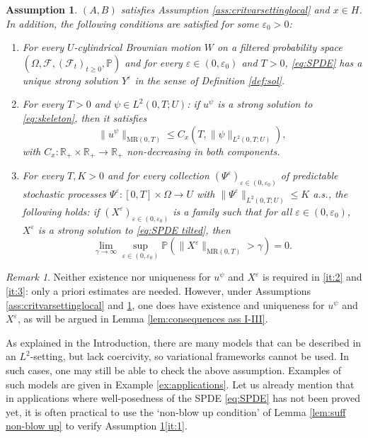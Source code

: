 \documentclass{amsart}
\renewcommand{\MR}{\mathrm{MR}}
\newcommand{\<}{\langle}
\newcommand{\?}{\rangle}
\newcommand{\col}{\colon}
\newcommand{\bphieps}{\Psi^{\eps}}
\theoremstyle{plain}
\theoremstyle{remark}
\newtheorem{remark}[theorem]{Remark}
\theoremstyle{plain}
\newtheorem{assumption}[theorem]{Assumption}
\numberwithin{equation}{section}
\def\R{{\mathbb R}}
\renewcommand{\P}{\mathbb{P}}
\newcommand{\Om}{\Omega}
\newcommand{\eps}{\varepsilon}
\begin{document}
   
\begin{assumption}\label{ass:coer replace} 
$(A,B)$  satisfies  Assumption  \ref{ass:critvarsettinglocal} and  $x\in H$. 
In addition, the following conditions are satisfied for some $\eps_0>0$:
\begin{enumerate}[label=\textit{(\Roman*)},ref=\textit{(\Roman*)}]
  \item\label{it:1} For every $U$-cylindrical Brownian motion $W$ on a filtered probability space $(\Om,\mathcal{F},(\mathcal{F}_t)_{t\geq 0},\P)$ and for every $\eps\in (0,\eps_0)$ and $T>0$, \eqref{eq:SPDE} has a unique strong solution $Y^\eps$ in the sense of Definition \ref{def:sol}. 
  \item\label{it:2} For every ${T}>0$ and $\psi\in L^2(0,{T};U)$: if   $u^{\psi}$ is a strong solution to \eqref{eq:skeleton}, then it satisfies 
  \begin{equation*} 
   \|u^\psi\|_{\MR(0,{T})}\leq C_{x}({T},\|\psi\|_{L^2(0,{T};U)}),
  \end{equation*}
   with $C_{x}\col \R_+\times \R_+\to\R_+$  non-decreasing in both components.  
\item\label{it:3} For every $T,K>0$ and for every collection $(\bphieps)_{\eps\in(0,\eps_0)}$ of predictable stochastic processes $\bphieps\col [0,T]\times \Om\to U$ with   $\|\bphieps\|_{L^2(0,T;U)}\leq K$ a.s., the following holds: 
if $(X^\eps)_{\eps\in(0,\eps_0)}$ is a family such that for all $\eps\in(0,\eps_0)$, $X^\eps$ is a strong solution to \eqref{eq:SPDE tilted}, then 
\begin{equation*} 
    \lim_{\gamma\to\infty}\sup_{\eps\in(0,\eps_0)}\P(\|X^\eps\|_{\MR(0,T)}>\gamma)=0. 
\end{equation*}
\end{enumerate} 
\end{assumption}



\begin{remark}
Neither existence nor uniqueness for $u^\psi$ and $X^\eps$ is required in \ref{it:2} and \ref{it:3}: only a priori estimates are needed. However, under Assumptions \ref{ass:critvarsettinglocal} and \ref{ass:coer replace},  one does have existence and uniqueness for $u^\psi$ and $X^\eps$, as will be argued in Lemma \ref{lem:consequences ass I-III}. 
\end{remark}

As explained in the Introduction, there are many models that can be described in an $L^2$-setting, but lack coercivity, so variational frameworks cannot be used. In such cases, one may still be able to check the above assumption. Examples of such models are given in Example \ref{ex:applications}. 
Let us already mention that in applications where well-posedness of the SPDE \eqref{eq:SPDE}  has not been proved yet, it is often practical to use  the `non-blow up condition' of  Lemma \ref{lem:suff non-blow up} to verify Assumption \ref{ass:coer replace}\ref{it:1}. 
\end{document}
